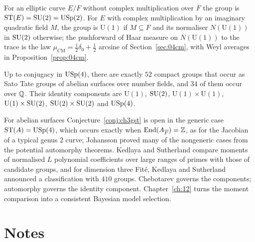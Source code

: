 For an elliptic curve $E/F$ without complex multiplication over $\overline F$ the group is $\mathrm{ST}(E)=\mathrm{SU}(2)=\mathrm{USp}(2)$. For $E$ with complex multiplication by an imaginary quadratic field $M$, the group is $\mathrm{U}(1)$ if $M\subseteq F$ and its normaliser $N(\mathrm{U}(1))$ in $\mathrm{SU}(2)$ otherwise; the pushforward of Haar measure on $N(\mathrm{U}(1))$ to the trace is the law $\mu_{\mathrm{CM}}=\tfrac12\delta_0+\tfrac12$ arcsine of Section~\ref{sec:04cm}, with Weyl averages in Proposition~\ref{prop:04cm}.

\begin{theorem}\label{thm:ch3fkrs}
Up to conjugacy in $\mathrm{USp}(4)$, there are exactly $52$ compact groups that occur as Sato Tate groups of abelian surfaces over number fields, and $34$ of them occur over $\mathbb{Q}$. Their identity components are $\mathrm{U}(1)$, $\mathrm{SU}(2)$, $\mathrm{U}(1)\times\mathrm{U}(1)$, $\mathrm{U}(1)\times\mathrm{SU}(2)$, $\mathrm{SU}(2)\times\mathrm{SU}(2)$ and $\mathrm{USp}(4)$.
\end{theorem}

For abelian surfaces Conjecture~\ref{conj:ch3gst} is open in the generic case $\mathrm{ST}(A)=\mathrm{USp}(4)$, which occurs exactly when $\operatorname{End}(A_{\overline F})=\mathbb{Z}$, as for the Jacobian of a typical genus $2$ curve; Johansson \cite{johansson2017} proved many of the nongeneric cases from the potential automorphy theorems. Kedlaya and Sutherland \cite{kedlayasutherland2009} compare moments of normalised $L$ polynomial coefficients over large ranges of primes with those of candidate groups, and for dimension three Fité, Kedlaya and Sutherland \cite{fks2021} announced a classification with $410$ groups. Chebotarev governs the components; automorphy governs the identity component. Chapter~\ref{ch:12} turns the moment comparison into a consistent Bayesian model selection.

\section{Notes}

